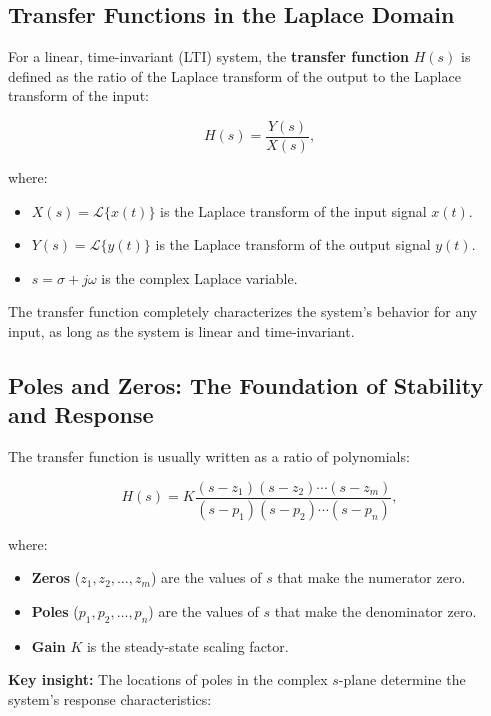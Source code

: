 \documentclass[11pt,letterpaper]{article}
\begin{document}
\subsection{Transfer Functions in the Laplace Domain}

For a linear, time-invariant (LTI) system, the \textbf{transfer function} $H(s)$ is defined as the ratio of the Laplace transform of the output to the Laplace transform of the input:

\begin{equation}
H(s) = \frac{Y(s)}{X(s)},
\label{eq:transfer_function}
\end{equation}

\noindent
where:
\begin{itemize}
    \item $X(s) = \mathcal{L}\{x(t)\}$ is the Laplace transform of the input signal $x(t)$.
    \item $Y(s) = \mathcal{L}\{y(t)\}$ is the Laplace transform of the output signal $y(t)$.
    \item $s = \sigma + j\omega$ is the complex Laplace variable.
\end{itemize}

\noindent
The transfer function completely characterizes the system's behavior for any input, as long as the system is linear and time-invariant.

\subsection{Poles and Zeros: The Foundation of Stability and Response}

The transfer function is usually written as a ratio of polynomials:

\begin{equation}
H(s) = K \frac{(s - z_1)(s - z_2) \cdots (s - z_m)}{(s - p_1)(s - p_2) \cdots (s - p_n)},
\end{equation}

\noindent
where:
\begin{itemize}
    \item \textbf{Zeros} ($z_1, z_2, \ldots, z_m$) are the values of $s$ that make the numerator zero.
    \item \textbf{Poles} ($p_1, p_2, \ldots, p_n$) are the values of $s$ that make the denominator zero.
    \item \textbf{Gain} $K$ is the steady-state scaling factor.
\end{itemize}

\noindent
\textbf{Key insight:} The locations of poles in the complex $s$-plane determine the system's response characteristics:
\end{document}
